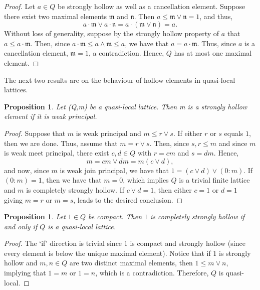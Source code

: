 \documentclass[11pt,english]{amsart}
\newtheorem{proposition}[theorem]{Proposition}
\theoremstyle{definition}
\numberwithin{equation}{section}
\theoremstyle{remark}
\def\leq{\leqslant}
\begin{document}
	\begin{proof}
		Let $a \in Q$ be strongly hollow as well as a cancellation element. Suppose there exist two maximal elements $\mathfrak{m}$ and $\mathfrak{n}$. Then $a \leq \mathfrak{m} \vee \mathfrak{n} = 1$, and thus, \[a \cdot \mathfrak{m} \vee a \cdot \mathfrak{n} = a \cdot (\mathfrak{m} \vee \mathfrak{n}) = a.\] 
		Without loss of generality, suppose by the strongly hollow property of $a$ that $a \leq a \cdot \mathfrak{m}$. Then, since $a \cdot \mathfrak{m} \leq a \wedge \mathfrak{m} \leq a$, we have that $a = a \cdot \mathfrak{m}$. Thus, since $a$ is a cancellation element, $\mathfrak{m} = 1$, a contradiction. Hence, $Q$ has at most one maximal element.
	\end{proof}
	
	The next two results are on the behaviour of hollow elements in quasi-local lattices.
	
	\begin{proposition}\label{P2.7}
		Let (Q,m) be a quasi-local lattice. Then m is a strongly hollow element if it is weak principal.
	\end{proposition}
	
	\begin{proof}
		Suppose that $m$ is weak principal and $m\leq r \vee s$. If either $r$ or $s$ equals $1$, then we are done. Thus, assume that $m=r\vee s$. Then, since $s,r\leq m$  and since $m$ is weak meet principal, there exist $c,d \in Q$ with $r=cm$ and $s=dm$. Hence, \[m=cm\vee dm = m(c\vee d),\] and now, since $m$ is weak join principal, we have that $1=(c\vee d)\vee (0:m)$. If $(0:m)=1$, then we have that $m=0$, which implies $Q$ is a trivial finite lattice and $m$ is completely strongly hollow. If $c\vee d =1$, then either $c=1$ or $d=1$ giving $m=r$ or $m=s$, leads to the desired conclusion. 
	\end{proof}
	
	\begin{proposition}\label{P2.11}
		Let $1\in Q$ be compact. Then $1$ is completely strongly hollow if and only if $Q$ is a quasi-local lattice.
	\end{proposition}
	
	\begin{proof}
		The `if' direction is trivial since $1$ is compact and strongly hollow (since every element is below the unique maximal element). Notice that if $1$ is strongly hollow and $m,n\in Q$ are two distinct maximal elements, then $1\leq m\vee n$, implying that $1=m \text{ or } 1=n$, which is a contradiction. Therefore, $Q$ is quasi-local.
	\end{proof}
	
\end{document}
